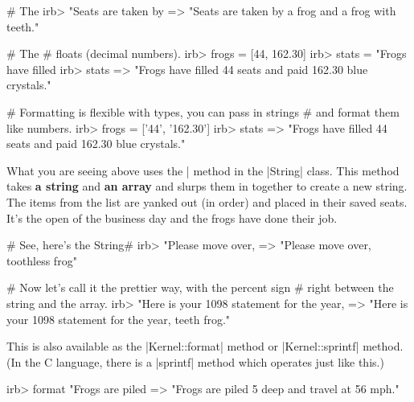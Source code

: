 \documentclass[12pt,twoside]{report}
\begin{document}
\begin{consolecode}

 # The %
 irb> "Seats are taken by %
   => "Seats are taken by a frog and a frog with teeth."

 # The %
 # floats (decimal numbers).
 irb> frogs = [44, 162.30]
 irb> stats = "Frogs have filled %
 irb> stats %
   => "Frogs have filled 44 seats and paid 162.30 blue crystals."

 # Formatting is flexible with types, you can pass in strings
 # and format them like numbers.
 irb> frogs = ['44', '162.30']
 irb> stats %
   => "Frogs have filled 44 seats and paid 162.30 blue crystals."

\end{consolecode}


What you are seeing above uses the \rubyinline|%
method in the \rubyinline|String| class. This method
takes {\bf a string} and {\bf an array} and slurps them in together to
create a new string.  The items from the list are yanked out (in
order) and placed in their saved seats.  It's the open of the business
day and the frogs have done their job.


\begin{consolecode}

 # See, here's the String#%
 irb> "Please move over, %
   => "Please move over, toothless frog"

 # Now let's call it the prettier way, with the percent sign
 # right between the string and the array.
 irb> "Here is your 1098 statement for the year, %
   => "Here is your 1098 statement for the year, teeth frog."

\end{consolecode}


This is also available as the
\rubyinline|Kernel::format| method or
\rubyinline|Kernel::sprintf| method.  (In the C
language, there is a \rubyinline|sprintf| method which
operates just like this.)


\begin{consolecode}

 irb> format "Frogs are piled %
   => "Frogs are piled 5 deep and travel at 56 mph."

\end{consolecode}
\end{document}
